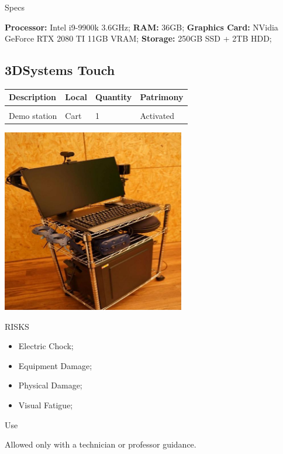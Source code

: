 {\Large Specs}
\vspace{1em}

\textbf{Processor:} Intel i9-9900k 3.6GHz; \textbf{RAM:} 36GB; \textbf{Graphics Card:} NVidia GeForce RTX 2080 TI 11GB VRAM; \textbf{Storage:} 250GB SSD + 2TB HDD;
\newpage

\subsection{3DSystems Touch}
\begin{tabularx}{\textwidth}{ Y  Y  Y  Y }
    \textbf{Description} &  \textbf{Local} &  \textbf{Quantity} & \textbf{Patrimony}\\
    \hline \\
     Demo station & Cart & 1 & Activated
\end{tabularx}
\vspace{1cm}

\begin{multicols}{2}

\includegraphics[width=80mm, keepaspectratio]{imgs/image3.jpg}

\columnbreak

\begin{mdframed}[roundcorner=10pt, linecolor=red, linewidth=2pt]
\vspace{1em}
{\Large {\color{red}RISKS}}
\vspace{1em}

\begin{itemize}
    \item Electric Chock;
    \item Equipment Damage;
    \item Physical Damage;
    \item Visual Fatigue; 
\end{itemize}

\vspace{1em}
\end{mdframed}

\vspace{2em}

{\Large Use}
\vspace{1em}

Allowed only with a technician or professor guidance.
\end{multicols}


